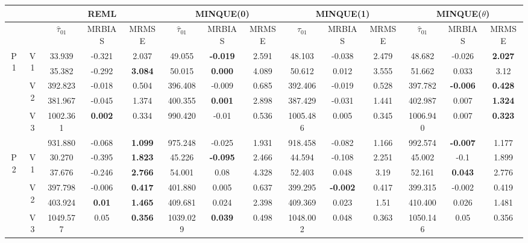 \documentclass[12pt,a4paper]{article}
\begin{document}
\begin{sidewaystable}[ht]
\centering
{\footnotesize
\begin{tabular}{cc|ccc|ccc|ccc|ccc|}
   & & \multicolumn{3}{c|}{REML}&\multicolumn{3}{c|}{MINQUE(0)}&\multicolumn{3}{c|}{MINQUE(1)}&\multicolumn{3}{c|}{MINQUE($\theta$)}\\ \hline
 &  & $\hat{\tau}_{01}$ & MRBIAS & MRMSE & $\hat{\tau}_{01}$ & MRBIAS & MRMSE & $\hat{\tau}_{01}$ & MRBIAS & MRMSE & $\hat{\tau}_{01}$ & MRBIAS & MRMSE \\ 
  \hline
\multirow{6}{*}{P1} & \multirow{2}{*}{V1} & 33.939 & -0.321 & 2.037 & 49.055 & \textbf{-0.019} & 2.591 & 48.103 & -0.038 & 2.479 & 48.682 & -0.026 & \textbf{2.027} \\ 
   &  & 35.382 & -0.292 & \textbf{3.084} & 50.015 & \textbf{0.000} & 4.089 & 50.612 & 0.012 & 3.555 & 51.662 & 0.033 & 3.12 \\ 
   & \multirow{2}{*}{V2} & 392.823 & -0.018 & 0.504 & 396.408 & -0.009 & 0.685 & 392.406 & -0.019 & 0.528 & 397.782 & \textbf{-0.006} & \textbf{0.428} \\ 
   &  & 381.967 & -0.045 & 1.374 & 400.355 & \textbf{0.001} & 2.898 & 387.429 & -0.031 & 1.441 & 402.987 & 0.007 & \textbf{1.324} \\ 
   & \multirow{2}{*}{V3} & 1002.361 & \textbf{0.002} & 0.334 & 990.420 & -0.01 & 0.536 & 1005.486 & 0.005 & 0.345 & 1006.940 & 0.007 & \textbf{0.323} \\ 
   &  & 931.880 & -0.068 & \textbf{1.099} & 975.248 & -0.025 & 1.931 & 918.458 & -0.082 & 1.166 & 992.574 & \textbf{-0.007} & 1.177 \\ 
   \hline \hline\multirow{6}{*}{P2} & \multirow{2}{*}{V1} & 30.270 & -0.395 & \textbf{1.823} & 45.226 & \textbf{-0.095} & 2.466 & 44.594 & -0.108 & 2.251 & 45.002 & -0.1 & 1.899 \\ 
   &  & 37.676 & -0.246 & \textbf{2.766} & 54.001 & 0.08 & 4.328 & 52.403 & 0.048 & 3.19 & 52.161 & \textbf{0.043} & 2.776 \\ 
   & \multirow{2}{*}{V2} & 397.798 & -0.006 & \textbf{0.417} & 401.880 & 0.005 & 0.637 & 399.295 & \textbf{-0.002} & 0.417 & 399.315 & -0.002 & 0.419 \\ 
   &  & 403.924 & \textbf{0.01} & \textbf{1.465} & 409.681 & 0.024 & 2.398 & 409.369 & 0.023 & 1.51 & 410.400 & 0.026 & 1.481 \\ 
   & \multirow{2}{*}{V3} & 1049.577 & 0.05 & \textbf{0.356} & 1039.029 & \textbf{0.039} & 0.498 & 1048.002 & 0.048 & 0.363 & 1050.146 & 0.05 & 0.356 \\ 

\end{tabular}}
\end{sidewaystable}
\end{document}
